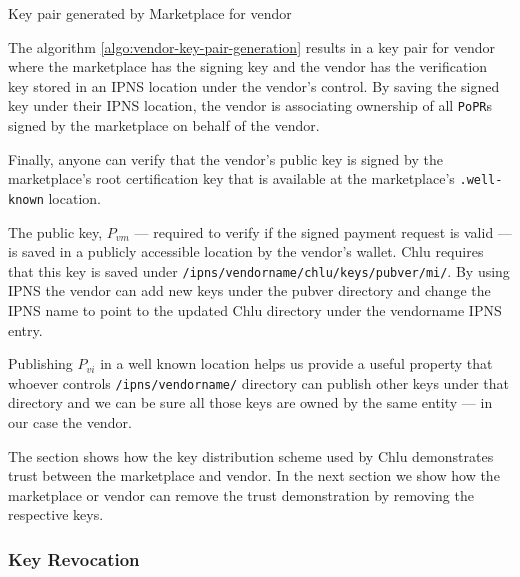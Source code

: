 \documentclass[a4paper]{article}
\begin{document}
\begin{algorithm}
  \caption{Key pair generated by Marketplace for vendor}\label{algo:vendor-key-pair-generation}
  \begin{algorithmic}
  \end{algorithmic}    
\end{algorithm}

The algorithm \ref{algo:vendor-key-pair-generation} results in a key
pair for vendor where the marketplace has the signing key and the
vendor has the verification key stored in an IPNS location under the
vendor's control. By saving the signed key under their IPNS location,
the vendor is associating ownership of all \texttt{PoPR}s signed by
the marketplace on behalf of the vendor.

Finally, anyone can verify that the vendor's public key is signed by
the marketplace's root certification key that is available at the
marketplace's \texttt{.well-known} location.

The public key, $P_{vm}$ --- required to verify if the signed payment
request is valid --- is saved in a publicly accessible location by the
vendor's wallet. Chlu requires that this key is saved under
\texttt{/ipns/vendorname/chlu/keys/pubver/mi/}. By using IPNS the
vendor can add new keys under the pubver directory and change the IPNS
name to point to the updated Chlu directory under the vendorname IPNS
entry.

Publishing $P_{vi}$ in a well known location helps us provide a useful
property that whoever controls \texttt{/ipns/vendorname/} directory
can publish other keys under that directory and we can be sure all
those keys are owned by the same entity --- in our case the vendor.

The section shows how the key distribution scheme used by Chlu
demonstrates trust between the marketplace and vendor. In the next
section we show how the marketplace or vendor can remove the trust
demonstration by removing the respective keys.

\subsubsection{Key Revocation}\label{sec:key-revocation}
\end{document}
